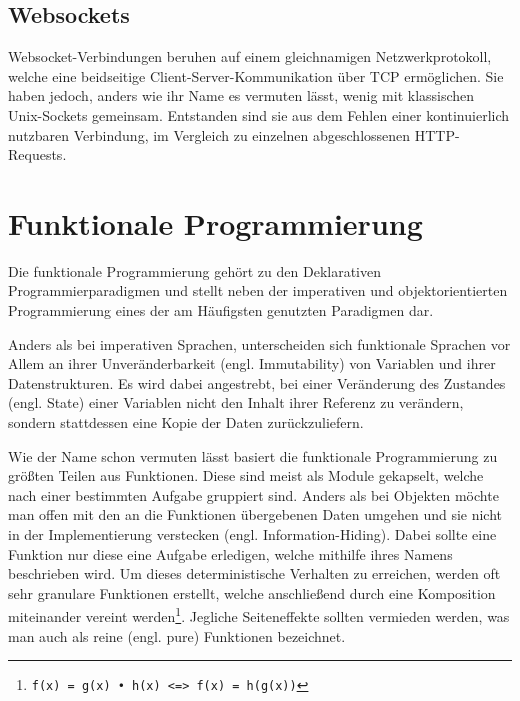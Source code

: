 \subsection{Websockets}
Websocket-Verbindungen beruhen auf einem gleichnamigen Netzwerkprotokoll, welche eine beidseitige Client-Server-Kommunikation über \acs{TCP} ermöglichen.
Sie haben jedoch, anders wie ihr Name es vermuten lässt, wenig mit klassischen Unix-Sockets gemeinsam.
Entstanden sind sie aus dem Fehlen einer kontinuierlich nutzbaren Verbindung, im Vergleich zu einzelnen abgeschlossenen HTTP-Requests.

\section{Funktionale Programmierung}
Die funktionale Programmierung gehört zu den Deklarativen Programmierparadigmen und stellt neben der imperativen und objektorientierten Programmierung eines der am Häufigsten genutzten Paradigmen dar.
\par
Anders als bei imperativen Sprachen, unterscheiden sich funktionale Sprachen vor Allem an ihrer Unveränderbarkeit (engl. Immutability) von Variablen und ihrer Datenstrukturen.
Es wird dabei angestrebt, bei einer Veränderung des Zustandes (engl. State) einer Variablen nicht den Inhalt ihrer Referenz zu verändern, sondern stattdessen eine Kopie der Daten zurückzuliefern.
\par
Wie der Name schon vermuten lässt basiert die funktionale Programmierung zu größten Teilen aus Funktionen. 
Diese sind meist als Module gekapselt, welche nach einer bestimmten Aufgabe gruppiert sind. 
Anders als bei Objekten möchte man offen mit den an die Funktionen übergebenen Daten umgehen und sie nicht in der Implementierung verstecken (engl. Information-Hiding). 
Dabei sollte eine Funktion nur diese eine Aufgabe erledigen, welche mithilfe ihres Namens beschrieben wird. 
Um dieses deterministische Verhalten zu erreichen, werden oft sehr granulare Funktionen erstellt, welche anschließend durch eine Komposition miteinander vereint werden\footnote{\texttt{f(x) = g(x) • h(x) <=> f(x) = h(g(x))}}.
Jegliche Seiteneffekte sollten vermieden werden, was man auch als reine (engl. pure) Funktionen bezeichnet.
